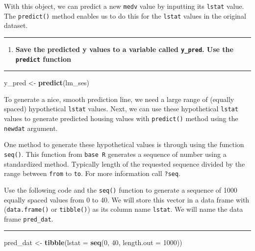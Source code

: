 \documentclass[
  12pt,
]{article}
\newenvironment{Shaded}{\begin{snugshade}}{\end{snugshade}}
\newcommand{\AttributeTok}[1]{\textcolor[rgb]{0.13,0.29,0.53}{#1}}
\newcommand{\DecValTok}[1]{\textcolor[rgb]{0.00,0.00,0.81}{#1}}
\newcommand{\FunctionTok}[1]{\textcolor[rgb]{0.13,0.29,0.53}{\textbf{#1}}}
\newcommand{\NormalTok}[1]{#1}
\newcommand{\OtherTok}[1]{\textcolor[rgb]{0.56,0.35,0.01}{#1}}
\providecommand{\tightlist}{%
  \setlength{\itemsep}{0pt}\setlength{\parskip}{0pt}}
\begin{document}
With this object, we can predict a new \texttt{medv} value by inputting
its \texttt{lstat} value. The \texttt{predict()} method enables us to do
this for the \texttt{lstat} values in the original dataset.

\begin{center}\rule{0.5\linewidth}{0.5pt}\end{center}

\begin{enumerate}
\def\labelenumi{\arabic{enumi}.}
\setcounter{enumi}{3}
\tightlist
\item
  \textbf{Save the predicted y values to a variable called
  \texttt{y\_pred}. Use the \texttt{predict} function}
\end{enumerate}

\begin{center}\rule{0.5\linewidth}{0.5pt}\end{center}

\begin{Shaded}
\begin{Highlighting}[]
\NormalTok{y\_pred }\OtherTok{\textless{}{-}} \FunctionTok{predict}\NormalTok{(lm\_ses)}
\end{Highlighting}
\end{Shaded}

To generate a nice, smooth prediction line, we need a large range of
(equally spaced) hypothetical \texttt{lstat} values. Next, we can use
these hypothetical \texttt{lstat} values to generate predicted housing
values with \texttt{predict()} method using the \texttt{newdat}
argument.

One method to generate these hypothetical values is through using the
function \texttt{seq()}. This function from \texttt{base\ R} generates a
sequence of number using a standardized method. Typically length of the
requested sequence divided by the range between \texttt{from} to
\texttt{to}. For more information call \texttt{?seq}.

Use the following code and the \texttt{seq()} function to generate a
sequence of 1000 equally spaced values from 0 to 40. We will store this
vector in a data frame with (\texttt{data.frame()} or \texttt{tibble()})
as its column name \texttt{lstat}. We will name the data frame
\texttt{pred\_dat}.

\begin{center}\rule{0.5\linewidth}{0.5pt}\end{center}

\begin{Shaded}
\begin{Highlighting}[]
\NormalTok{pred\_dat }\OtherTok{\textless{}{-}} \FunctionTok{tibble}\NormalTok{(}\AttributeTok{lstat =} \FunctionTok{seq}\NormalTok{(}\DecValTok{0}\NormalTok{, }\DecValTok{40}\NormalTok{, }\AttributeTok{length.out =} \DecValTok{1000}\NormalTok{))}
\end{Highlighting}
\end{Shaded}
\end{document}
